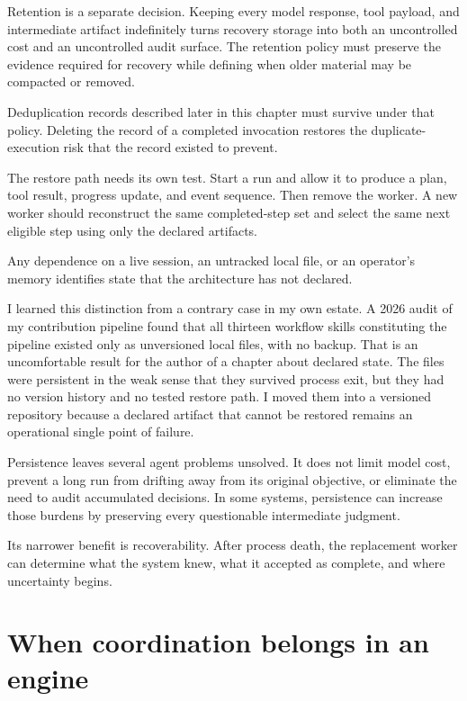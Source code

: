 Retention is a separate decision. Keeping every model response, tool payload, and intermediate artifact indefinitely turns recovery storage into both an uncontrolled cost and an uncontrolled audit surface. The retention policy must preserve the evidence required for recovery while defining when older material may be compacted or removed.

Deduplication records described later in this chapter must survive under that policy. Deleting the record of a completed invocation restores the duplicate-execution risk that the record existed to prevent.

The restore path needs its own test. Start a run and allow it to produce a plan, tool result, progress update, and event sequence. Then remove the worker. A new worker should reconstruct the same completed-step set and select the same next eligible step using only the declared artifacts.

Any dependence on a live session, an untracked local file, or an operator's memory identifies state that the architecture has not declared.

I learned this distinction from a contrary case in my own estate. A 2026 audit of my contribution pipeline found that all thirteen workflow skills constituting the pipeline existed only as unversioned local files, with no backup. That is an uncomfortable result for the author of a chapter about declared state. The files were persistent in the weak sense that they survived process exit, but they had no version history and no tested restore path. I moved them into a versioned repository because a declared artifact that cannot be restored remains an operational single point of failure.

Persistence leaves several agent problems unsolved. It does not limit model cost, prevent a long run from drifting away from its original objective, or eliminate the need to audit accumulated decisions. In some systems, persistence can increase those burdens by preserving every questionable intermediate judgment.

Its narrower benefit is recoverability. After process death, the replacement worker can determine what the system knew, what it accepted as complete, and where uncertainty begins.

\hypertarget{when-coordination-belongs-in-an-engine}{%
\section{When coordination belongs in an engine}\label{when-coordination-belongs-in-an-engine}}

